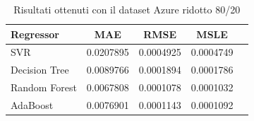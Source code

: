 \begin{table}[H]
    \centering
    \begin{tabular}{|>{\centering\arraybackslash}m{5cm}|c|c|c|c|}
        \hline
        \textbf{Regressor} & \textbf{MAE} & \textbf{RMSE} & \textbf{MSLE} \\ [10pt]
        \hline
        SVR & 0.0207895 & 0.0004925 & 0.0004749 \\ [10pt]
        \hline
        Decision Tree & 0.0089766 & 0.0001894 & 0.0001786 \\ [10pt]
        \hline
        Random Forest & 0.0067808 & 0.0001078 & 0.0001032 \\ [10pt]
        \hline
        AdaBoost & 0.0076901 & 0.0001143 & 0.0001092 \\ [10pt]
        \hline
    \end{tabular}
    \caption{Risultati ottenuti con il dataset Azure ridotto 80/20}
    \label{tab:results}
\end{table}

